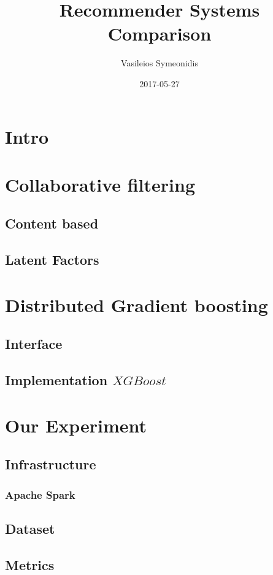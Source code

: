 \documentclass{article}
\title{Recommender Systems Comparison}
\date{2017-05-27}
\author{Vasileios Symeonidis}
\begin{document}
\maketitle
\tableofcontents
{}
\newpage
{}

\section{Intro}

\section{Collaborative filtering}
\subsection{Content based}
\subsection{Latent Factors}

\section{Distributed Gradient boosting}
\subsection{Interface}
\subsection{Implementation \(XGBoost\)}

\section{Our Experiment}
\subsection{Infrastructure}
\subsubsection{Apache Spark}
\subsection{Dataset}
\subsection{Metrics}
\end{document}
